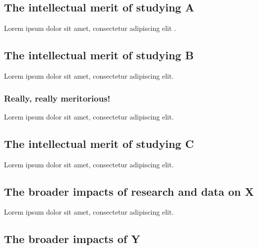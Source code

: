 \documentclass[
      12pt,
        ]{article}
\begin{document}
\setcounter{page}{1}

\hypertarget{the-intellectual-merit-of-studying-a}{%
\subsection{The intellectual merit of studying A}\label{the-intellectual-merit-of-studying-a}}

Lorem ipsum dolor sit amet, consectetur adipiscing elit \citep{Schattschneider1975}.

\hypertarget{the-intellectual-merit-of-studying-b}{%
\subsection{The intellectual merit of studying B}\label{the-intellectual-merit-of-studying-b}}

Lorem ipsum dolor sit amet, consectetur adipiscing elit.

\hypertarget{really-really-meritorious}{%
\subsubsection{Really, really meritorious!}\label{really-really-meritorious}}

Lorem ipsum dolor sit amet, consectetur adipiscing elit.

\hypertarget{the-intellectual-merit-of-studying-c}{%
\subsection{The intellectual merit of studying C}\label{the-intellectual-merit-of-studying-c}}

Lorem ipsum dolor sit amet, consectetur adipiscing elit.

\hypertarget{the-broader-impacts-of-research-and-data-on-x}{%
\subsection{The broader impacts of research and data on X}\label{the-broader-impacts-of-research-and-data-on-x}}

Lorem ipsum dolor sit amet, consectetur adipiscing elit.

\hypertarget{the-broader-impacts-of-y}{%
\subsection{The broader impacts of Y}\label{the-broader-impacts-of-y}}
\end{document}

